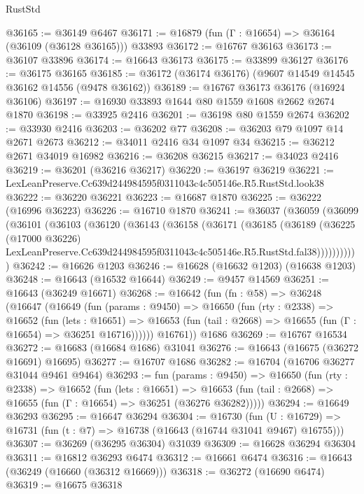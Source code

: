 \begin{lexlean}{RustStd}
\begin{coremodule}
@36165 := @36149 @6467
@36171 := @16879 (fun (Γ : @16654) => @36164 (@36109 (@36128 @36165))) @33893
@36172 := @16767 @36163
@36173 := @36107 @33896
@36174 := @16643 @36173
@36175 := @33899 @36127
@36176 := @36175 @36165
@36185 := @36172 (@36174 @36176) (@9607 @14549 @14545 @36162 @14556 (@9478 @36162))
@36189 := @16767 @36173 @36176 (@16924 @36106)
@36197 := @16930 @33893 @1644 @80 @1559 @1608 @2662 @2674 @1870
@36198 := @33925 @2416
@36201 := @36198 @80 @1559 @2674
@36202 := @33930 @2416
@36203 := @36202 @77
@36208 := @36203 @79 @1097 @14 @2671 @2673
@36212 := @34011 @2416 @34 @1097 @34
@36215 := @36212 @2671 @34019 @16982
@36216 := @36208 @36215
@36217 := @34023 @2416
@36219 := @36201 (@36216 @36217)
@36220 := @36197 @36219
@36221 := LexLeanPreserve.Cc639d244984595f0311043c4c505146e.R5.RustStd.look38
@36222 := @36220 @36221
@36223 := @16687 @1870
@36225 := @36222 (@16996 @36223)
@36226 := @16710 @1870
@36241 := @36037
    (@36059
      (@36099
        (@36101
          (@36103
            (@36120
              (@36143
                (@36158
                  (@36171
                    (@36185
                      (@36189
                        (@36225
                          (@17000 @36226)
                          LexLeanPreserve.Cc639d244984595f0311043c4c505146e.R5.RustStd.fal38)))))))))))
@36242 := @16626 @1203
@36246 := @16628 (@16632 @1203) (@16638 @1203)
@36248 := @16643 (@16532 @16644)
@36249 := @9457 @14569
@36251 := @16643 (@36249 @16671)
@36268 := @16642
    (fun (fn : @58) =>
    @36248
      (@16647
        (@16649
          (fun (params : @9450) =>
          @16650
            (fun (rty : @2338) =>
            @16652
              (fun (lets : @16651) =>
              @16653 (fun (tail : @2668) => @16655 (fun (Γ : @16654) => @36251 @16716))))))
        @16761))
    @1686
@36269 := @16767 @16534
@36272 := @16683 (@16684 @1686) @31041
@36276 := @16643 (@16675 (@36272 @16691) @16695)
@36277 := @16707 @1686
@36282 := @16704 (@16706 @36277 @31044 @9461 @9464)
@36293 := fun (params : @9450) =>
  @16650
    (fun (rty : @2338) =>
    @16652
      (fun (lets : @16651) =>
      @16653 (fun (tail : @2668) => @16655 (fun (Γ : @16654) => @36251 (@36276 @36282)))))
@36294 := @16649 @36293
@36295 := @16647 @36294
@36304 := @16730
    (fun (U : @16729) => @16731 (fun (t : @7) => @16738 (@16643 (@16744 @31041 @9467) @16755)))
@36307 := @36269 (@36295 @36304) @31039
@36309 := @16628 @36294 @36304
@36311 := @16812 @36293 @6474
@36312 := @16661 @6474
@36316 := @16643 (@36249 (@16660 (@36312 @16669)))
@36318 := @36272 (@16690 @6474)
@36319 := @16675 @36318

\end{coremodule}
\end{lexlean}
